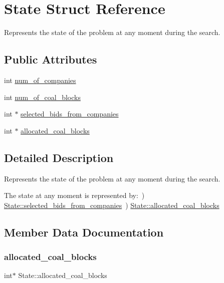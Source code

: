 \hypertarget{structState}{}\section{State Struct Reference}
\label{structState}


Represents the state of the problem at any moment during the search.  


\subsection*{Public Attributes}
\begin{DoxyCompactItemize}
\item 
int \hyperlink{structState_aff5c814b2070259023644917cc7bdd2e}{num\+\_\+of\+\_\+companies}
\item 
int \hyperlink{structState_a9d0176a5edaf8f81c9e69bc3e1579f04}{num\+\_\+of\+\_\+coal\+\_\+blocks}
\item 
int $\ast$ \hyperlink{structState_a52cd42ec679f0af76c92ff88d7a079a0}{selected\+\_\+bids\+\_\+from\+\_\+companies}
\item 
int $\ast$ \hyperlink{structState_a9b7fe730b545c321dec2897f8c3c8cbf}{allocated\+\_\+coal\+\_\+blocks}
\end{DoxyCompactItemize}


\subsection{Detailed Description}
Represents the state of the problem at any moment during the search. 

The state at any moment is represented by\+:~) \hyperlink{structState_a52cd42ec679f0af76c92ff88d7a079a0}{State\+::selected\+\_\+bids\+\_\+from\+\_\+companies}~) \hyperlink{structState_a9b7fe730b545c321dec2897f8c3c8cbf}{State\+::allocated\+\_\+coal\+\_\+blocks} 

\subsection{Member Data Documentation}
\mbox{\label{structState_a9b7fe730b545c321dec2897f8c3c8cbf}} 
\subsubsection{\texorpdfstring{allocated\+\_\+coal\+\_\+blocks}{allocated\_coal\_blocks}}
{\footnotesize\ttfamily int$\ast$ State\+::allocated\+\_\+coal\+\_\+blocks}

